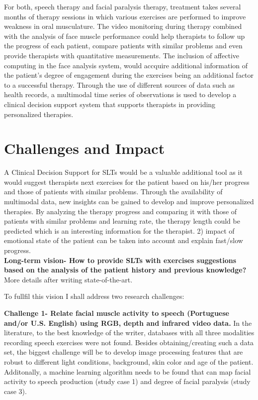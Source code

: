 For both, speech therapy and facial paralysis therapy, treatment takes several months of therapy sessions in which various exercises are performed to improve weakness in oral musculature. The video monitoring during therapy combined with the analysis of face muscle performance could help therapists to follow up the progress of each patient, compare patients with similar problems and even provide therapists with quantitative measurements. The inclusion of affective computing in the face analysis system, would accquire additional information of the patient's degree of engagement during the exercises being an additional factor to a successful therapy. Through the use of different sources of data such as health records, a multimodal time series of observations is used to develop a clinical decision support system that supports therapists in providing personalized therapies.

\section{Challenges and Impact}
\begin{comment}
what is a normal manner of speaking? Can such a manner be defined?
\end{comment}
A Clinical Decision Support for SLTs would be a valuable additional tool as it would suggest therapists next exercises for the patient based on his/her progress and those of patients with similar problems. Through the availability of multimodal data, new insights can be gained to develop and improve personalized therapies. By analyzing the therapy progress and comparing it with those of patients with similar problems and learning rate, the therapy length could be predicted which is an interesting information for the therapist.
2) impact of emotional state of the patient can be taken into account and explain fast/slow progress.\\

\textbf{Long-term vision- How to provide SLTs with exercises suggestions based on the analysis of the patient history and previous knowledge?} More details after writing state-of-the-art.

To fullfil this vision I shall address two research challenges:

\textbf{Challenge 1- Relate facial muscle activity to speech (Portuguese and/or U.S. English) using RGB, depth and infrared video data.}
In the literature, to the best knowledge of the writer, databases with all three modalities recording speech exercises were not found. Besides obtaining/creating such a data set, the biggest challenge will be to develop image processing features that are robust to different light conditions, background, skin color and age of the patient. Additonally, a machine learning algorithm needs to be found that can map facial activity to speech production (study case 1) and degree of facial paralysis (study case 3).

